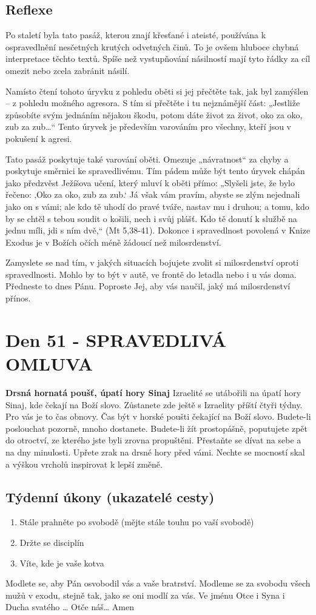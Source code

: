 \documentclass[11pt]{article}
\newcommand{\zacatekOsmyTyden}{
  \textbf{Drsná hornatá poušť, úpatí hory Sinaj} \newline 
  Izraelité se utábořili na úpatí hory Sinaj, kde čekají na Boží slovo. Zůstanete zde ještě s Izraelity příští čtyři týdny. Pro vás je to čas obnovy. Čas být v horské poušti čekající na Boží slovo. Budete-li poslouchat pozorně, mnoho dostanete. Budete-li žít prostopášně, poputujete zpět do otroctví, ze kterého jste byli zrovna propuštěni. Přestaňte se dívat na sebe a na dny minulosti. Upřete zrak na drsné hory před vámi. Nechte se mocností skal a výškou vrcholů inspirovat k lepší změně.
  \subsection*{Týdenní úkony (ukazatelé cesty)}
\begin{enumerate}
  \item Stále prahněte po svobodě (mějte stále touhu po vaší svobodě)
  \item Držte se disciplín
  \item Víte, kde je vaše kotva
\end{enumerate}
Modlete se, aby Pán osvobodil vás a vaše bratrství. \newline
Modleme se za svobodu všech mužů v exodu, stejně tak, jako se oni modlí za vás.\newline
Ve jménu Otce i Syna i Ducha svatého …  Otče náš… Amen
}
\begin{document}
\subsection*{Reflexe}
Po staletí byla tato pasáž, kterou znají křesťané i ateisté, používána k ospravedlnění nesčetných krutých odvetných činů. To je
ovšem hluboce chybná interpretace těchto textů. Spíše než vystupňování násilností mají tyto řádky za cíl omezit nebo zcela
zabránit násilí.

Namísto čtení tohoto úryvku z pohledu oběti si jej přečtěte tak, jak byl zamýšlen – z pohledu možného agresora. S tím si přečtěte i
tu nejznámější část: „Jestliže způsobíte svým jednáním nějakou škodu, potom dáte život za život, oko za oko, zub za zub…“ Tento
úryvek je především varováním pro všechny, kteří jsou v pokušení k agresi.

Tato pasáž poskytuje také varování oběti. Omezuje „návratnost“ za chyby a poskytuje směrnici ke spravedlivému. Tím pádem
může být tento úryvek chápán jako předzvěst Ježíšova učení, který mluví k oběti přímo: „Slyšeli jste, že bylo řečeno: ‚Oko za oko,
zub za zub.‘ Já však vám pravím, abyste se zlým nejednali jako on s vámi; ale kdo tě uhodí do pravé tváře, nastav mu i druhou; a
tomu, kdo by se chtěl s tebou soudit o košili, nech i svůj plášť. Kdo tě donutí k službě na jednu míli, jdi s ním dvě,“ (Mt 5,38-41). 
Dokonce i spravedlnost povolená v Knize Exodus je v Božích očích méně žádoucí než milosrdenství.

Zamyslete se nad tím, v jakých situacích bojujete zvolit si milosrdenství oproti spravedlnosti. Mohlo by to být v autě, ve frontě do
letadla nebo i u vás doma. Předneste to dnes Pánu. Poproste Jej, aby vás naučil, jaký má milosrdenství přínos.

\newpage
\section{Den 51 - SPRAVEDLIVÁ OMLUVA}
\zacatekOsmyTyden
\end{document}
